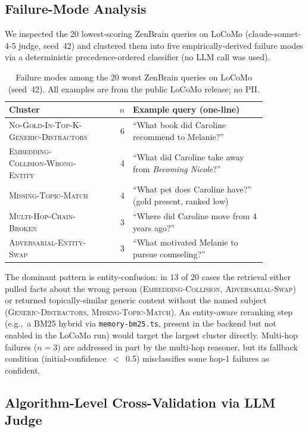 \documentclass{article}
\begin{document}
\subsection{Failure-Mode Analysis}
\label{app:failure-modes}

We inspected the 20 lowest-scoring ZenBrain queries on LoCoMo
(claude-sonnet-4-5 judge, seed~42) and clustered them into five
empirically-derived failure modes via a deterministic precedence-ordered
classifier (no LLM call was used).

\begin{table}[h]
\centering
\small
\caption{Failure modes among the 20 worst ZenBrain queries on LoCoMo
(seed~42). All examples are from the public LoCoMo release; no PII.}
\label{tab:failure-modes}
\begin{tabular}{p{0.34\linewidth}rp{0.52\linewidth}}
\toprule
Cluster & $n$ & Example query (one-line) \\
\midrule
\textsc{No-Gold-In-Top-K-Generic-Distractors} & 6 & ``What book did Caroline recommend to Melanie?'' \\
\textsc{Embedding-Collision-Wrong-Entity}     & 4 & ``What did Caroline take away from \emph{Becoming Nicole}?'' \\
\textsc{Missing-Topic-Match}                  & 4 & ``What pet does Caroline have?'' (gold present, ranked low) \\
\textsc{Multi-Hop-Chain-Broken}               & 3 & ``Where did Caroline move from 4 years ago?'' \\
\textsc{Adversarial-Entity-Swap}              & 3 & ``What motivated Melanie to pursue counseling?'' \\
\bottomrule
\end{tabular}
\end{table}

The dominant pattern is entity-confusion: in $13$ of $20$ cases the retrieval
either pulled facts about the wrong person (\textsc{Embedding-Collision},
\textsc{Adversarial-Swap}) or returned topically-similar generic content
without the named subject (\textsc{Generic-Distractors},
\textsc{Missing-Topic-Match}). An entity-aware reranking step (e.g.,\ a
BM25 hybrid via \texttt{memory-bm25.ts}, present in the backend but not
enabled in the LoCoMo run) would target the largest cluster directly.
Multi-hop failures ($n{=}3$) are addressed in part by the multi-hop
reasoner, but its fallback condition (initial-confidence~$<$~0.5)
misclassifies some hop-1 failures as confident.

\subsection{Algorithm-Level Cross-Validation via LLM Judge}
\label{app:ablation-judge}
\end{document}
